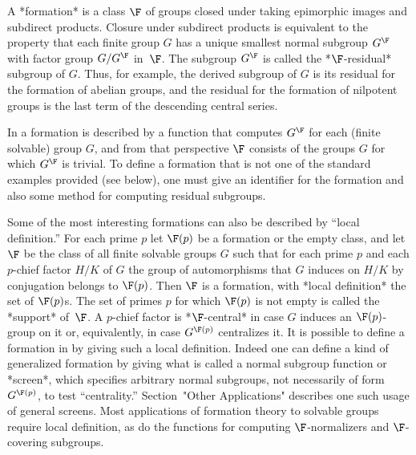 


A *formation* is a class ${\F}$ of groups closed under taking epimorphic
images and subdirect products. Closure under subdirect products is equivalent to the property that each finite group $G$  has a unique 
smallest normal subgroup $G^{\F}$ with factor group $G / G^{\F}$ in~$\F$. 
The subgroup $G^{\F}$ is called the *$\F$-residual* subgroup of $G$. Thus, 
for example, the derived subgroup of $G$ is its residual for the formation 
of abelian groups, and the residual for the formation of nilpotent groups 
is the last term of the descending central series. 

In {\FORMAT} a formation is described by a function that computes $G^{\F}$ 
for each (finite solvable) group $G$, and from that perspective $\F$ 
consists of the groups $G$ for which $G^{\F}$ is trivial. To define a 
formation that is not one of the standard examples provided (see below), 
one must give {\GAP} an identifier for the formation and also some method 
for computing residual subgroups. 

Some of the most interesting formations can also be described by ``local definition.'' For each prime $p$ 
let $\F(p)$ be a formation or the empty class, and let $\F$ be the class 
of all finite solvable groups $G$ such that for each prime $p$ and each $p$-chief factor $H/K$ of $G$ the group of automorphisms that $G$ 
induces on $H/K$ by conjugation belongs to $\F(p)$. Then $\F$ is a 
formation,  with  *local definition*  the set of $ \F(p)$s. 
The set of primes $p$ for which $\F(p)$ is not empty is called the 
*support* of~$\F$. A $p$-chief factor is *$\F$-central* in case $G$
induces an $\F(p)$-group on it or, equivalently, in case $G^{\F(p)}$
centralizes it. It is possible to define a formation in {\FORMAT} by
giving such a local definition. Indeed one can define a kind of
generalized formation by giving what is called a normal subgroup function 
or *screen*, which specifies arbitrary normal subgroups, not necessarily 
of form $G^{\F(p)}$, to test ``centrality.'' Section~"Other Applications" describes one such usage of general screens. Most applications of formation 
theory to solvable groups require local definition, as do the {\GAP} 
functions for computing $\F$-normalizers and $\F$-covering subgroups. 

